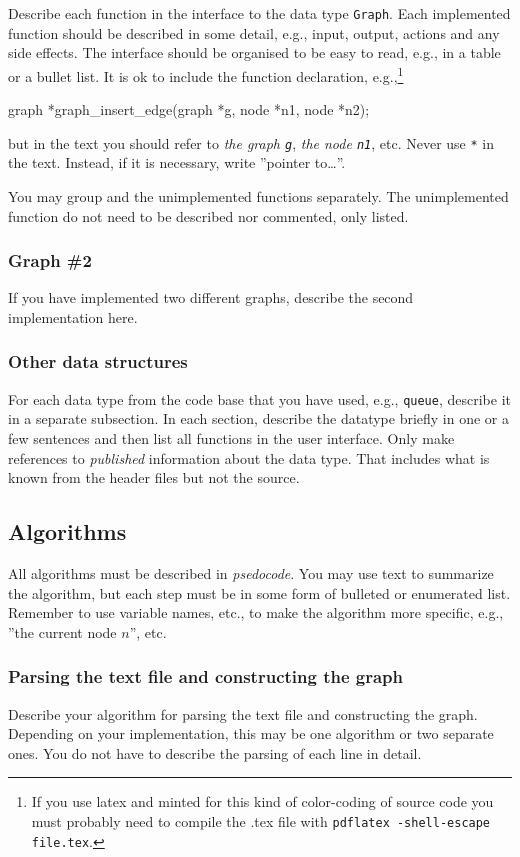 \documentclass{article}
\begin{document}
Describe each function in the interface to the data type \texttt{Graph}. Each
implemented function should be described in some detail, e.g., input,
output, actions and any side effects. The interface should be
organised to be easy to read, e.g., in a table or a bullet list. It is
ok to include the function declaration, e.g.,\footnote{If you use latex and minted for this kind of color-coding
of source code you must probably need to compile the .tex file with
\texttt{pdflatex -shell-escape file.tex}.}
\begin{ccode}
graph *graph_insert_edge(graph *g, node *n1, node *n2);
\end{ccode}
but in the text you should refer to \emph{the graph \texttt{g}}, \emph{the node \texttt{n1}},
etc. Never use \texttt{*} in the text. Instead, if it is necessary, write
''pointer to\ldots{}''.

You may group and the unimplemented functions separately. The
unimplemented function do not need to be described nor commented, only
listed.

\subsubsection{Graph \#2}
\label{sec:graph2}
If you have implemented two different graphs, describe the second
implementation here.

\subsubsection{Other data structures}
\label{sec:other_data_structures}
For each data type from the code base that you have used, e.g.,
\texttt{queue}, describe it in a separate subsection. In each section,
describe the datatype briefly in one or a few sentences and then list
all functions in the user interface. Only make references to
\emph{published} information about the data type. That includes what is
known from the header files but not the source.

\subsection{Algorithms}
\label{sec:algorithms}
All algorithms must be described in \emph{psedocode}. You may use text to
summarize the algorithm, but each step must be in some form of
bulleted or enumerated list. Remember to use variable names, etc., to
make the algorithm more specific, e.g., ''the current node \(n\)'', etc.
\subsubsection{Parsing the text file and constructing the graph}
\label{sec:parse}
Describe your algorithm for parsing the text file and constructing the
graph. Depending on your implementation, this may be one algorithm or
two separate ones. You do not have to describe the parsing of each
line in detail.
\end{document}
